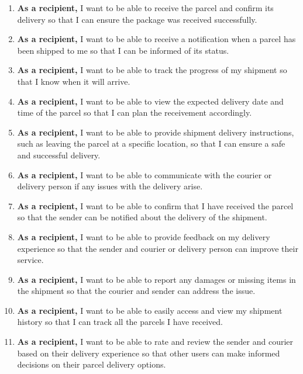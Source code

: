 \begin{enumerate}
    \item \textbf{As a recipient,} I want to be able to receive the parcel and confirm its delivery so that I can ensure the package was received successfully.
    \item \textbf{As a recipient,} I want to be able to receive a notification when a parcel has been shipped to me so that I can be informed of its status.
    \item \textbf{As a recipient,} I want to be able to track the progress of my shipment so that I know when it will arrive.
    \item \textbf{As a recipient,} I want to be able to view the expected delivery date and time of the parcel so that I can plan the receivement accordingly.
    \item \textbf{As a recipient,} I want to be able to provide shipment delivery instructions, such as leaving the parcel at a specific location, so that I can ensure a safe and successful delivery.
    \item \textbf{As a recipient,} I want to be able to communicate with the courier or delivery person if any issues with the delivery arise.
    \item \textbf{As a recipient,} I want to be able to confirm that I have received the parcel so that the sender can be notified about the delivery of the shipment.
    \item \textbf{As a recipient,} I want to be able to provide feedback on my delivery experience so that the sender and courier or delivery person can improve their service.
    \item \textbf{As a recipient,} I want to be able to report any damages or missing items in the shipment so that the courier and sender can address the issue.
    \item \textbf{As a recipient,} I want to be able to easily access and view my shipment history so that I can track all the parcels I have received.
    \item \textbf{As a recipient,} I want to be able to rate and review the sender and courier based on their delivery experience so that other users can make informed decisions on their parcel delivery options.

\end{enumerate}
